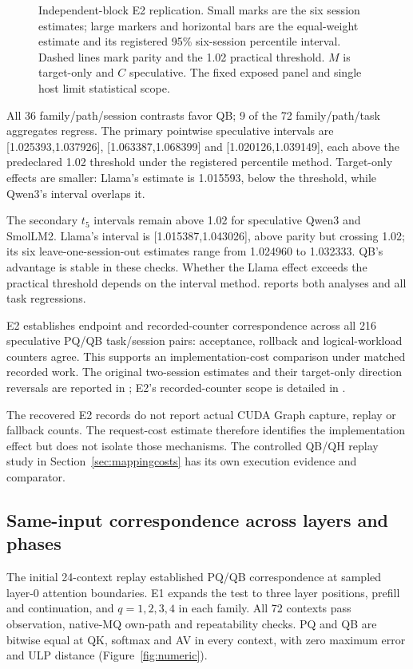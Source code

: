 \begin{figure}[t]\centering

\caption{Independent-block E2 replication. Small marks are the six session estimates; large markers and horizontal bars are the equal-weight estimate and its registered 95\% six-session percentile interval. Dashed lines mark parity and the 1.02 practical threshold. $M$ is target-only and $C$ speculative. The fixed exposed panel and single host limit statistical scope.}
\label{fig:e2}
\end{figure}

All 36 family/path/session contrasts favor QB; 9 of the 72 family/path/task aggregates regress. The primary pointwise speculative intervals are [1.025393,1.037926], [1.063387,1.068399] and [1.020126,1.039149], each above the predeclared 1.02 threshold under the registered percentile method. Target-only effects are smaller: Llama's estimate is 1.015593, below the threshold, while Qwen3's interval overlaps it.

The secondary $t_5$ intervals remain above 1.02 for speculative Qwen3 and SmolLM2. Llama's interval is [1.015387,1.043026], above parity but crossing 1.02; its six leave-one-session-out estimates range from 1.024960 to 1.032333. QB's advantage is stable in these checks. Whether the Llama effect exceeds the practical threshold depends on the interval method.  reports both analyses and all task regressions.

E2 establishes endpoint and recorded-counter correspondence across all 216 speculative PQ/QB task/session pairs: acceptance, rollback and logical-workload counters agree. This supports an implementation-cost comparison under matched recorded work. The original two-session estimates and their target-only direction reversals are reported in ; E2's recorded-counter scope is detailed in .

The recovered E2 records do not report actual CUDA Graph capture, replay or fallback counts. The request-cost estimate therefore identifies the implementation effect but does not isolate those mechanisms. The controlled QB/QH replay study in Section~\ref{sec:mappingcosts} has its own execution evidence and comparator.


\subsection{Same-input correspondence across layers and phases}
\label{sec:numeric}
The initial 24-context replay established PQ/QB correspondence at sampled layer-0 attention boundaries. E1 expands the test to three layer positions, prefill and continuation, and $q=1,2,3,4$ in each family. All 72 contexts pass observation, native-MQ own-path and repeatability checks. PQ and QB are bitwise equal at QK, softmax and AV in every context, with zero maximum error and ULP distance (Figure~\ref{fig:numeric}).

